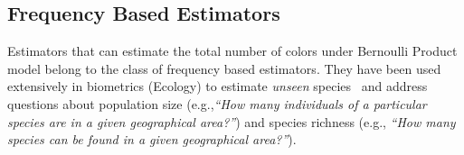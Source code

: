 \documentclass[sigconf,review,anonymous]{acmart}
\begin{document}
\subsection{Frequency Based Estimators}
\label{sec:estimators}
Estimators that can estimate the total number of colors under Bernoulli Product model belong to the class of frequency based estimators.
They have been used extensively in biometrics (Ecology)
to estimate \emph{unseen} species~\cite{chao2016species} and
 address questions about population size %
 (e.g.,\emph{``How many individuals of a particular species are in a given geographical area?''})
and species richness %
 (e.g., \emph{``How many species can be found in a given geographical area?''}).

%


%
%
\end{document}
